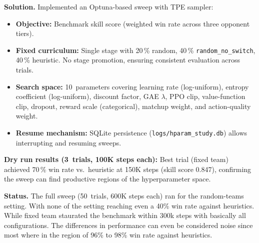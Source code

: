 \textbf{Solution.} Implemented an Optuna-based sweep with TPE sampler:
\begin{itemize}
  \item \textbf{Objective:} Benchmark skill score (weighted win rate across
        three opponent tiers).
  \item \textbf{Fixed curriculum:} Single stage with 20\,\% random,
        40\,\% \texttt{random\_no\_switch}, 40\,\% heuristic.  No stage
        promotion, ensuring consistent evaluation across trials.
  \item \textbf{Search space:} 10~parameters covering learning rate
        (log-uniform), entropy coefficient (log-uniform), discount factor,
        GAE $\lambda$, PPO clip, value-function clip, dropout, reward scale
        (categorical), matchup weight, and action-quality weight.
  \item \textbf{Resume mechanism:} SQLite persistence
        (\texttt{logs/hparam\_study.db}) allows interrupting and resuming
        sweeps.
\end{itemize}

\textbf{Dry run results (3~trials, 100K steps each):} Best trial (fixed team) achieved
70\,\% win rate vs.\ heuristic at 150K steps (skill score 0.847), confirming
the sweep can find productive regions of the hyperparameter space.

\textbf{Status.} The full sweep (50~trials, 600K steps each) ran for the random-teams setting. With none of the setting reaching even a 40\% win rate against heuristics. While fixed team staurated the benchmark within 300k steps with basically all configurations. The differences in performance can even be considered noise since most where in the region of 96\% to 98\% win rate against heuristics.

